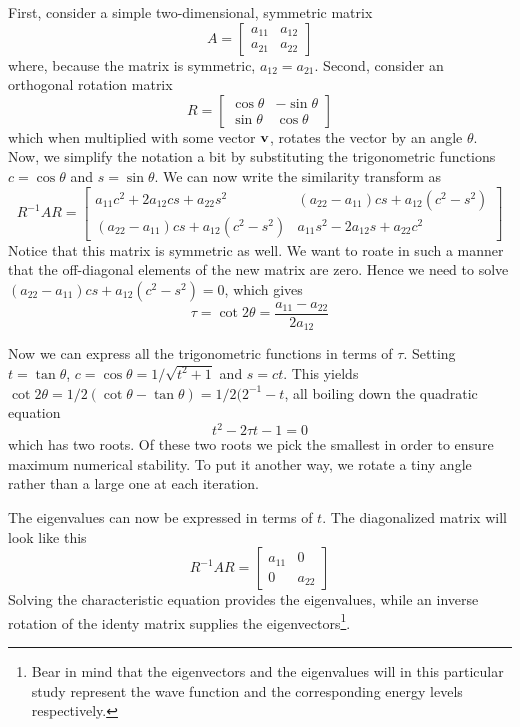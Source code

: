 \documentclass[10pt, a4paper]{amsart}
\begin{document}
First, consider a simple two-dimensional, symmetric matrix
\begin{equation}
A = \begin{bmatrix}
a_{11} & a_{12} \\
a_{21} & a_{22}
\end{bmatrix}
\end{equation}
where, because the matrix is symmetric, $a_{12}=a_{21}$. Second, consider an orthogonal rotation matrix
\begin{equation}
R = \begin{bmatrix}
\cos{\theta} & -\sin{\theta} \\
\sin{\theta} & \cos{\theta}
\end{bmatrix}
\end{equation}
which when multiplied with some vector $\vb{v}$, rotates the vector by an angle $\theta$. Now, we simplify the notation a bit by substituting the trigonometric functions $c=\cos{\theta}$ and $s=\sin{\theta}$. We can now write the similarity transform as
\begin{equation}
R^{-1}AR=\begin{bmatrix}
a_{11}c^2+2a_{12}cs + a_{22}s^2 & (a_{22}-a_{11})cs+a_{12}(c^2-s^2) \\
(a_{22}-a_{11})cs + a_{12}(c^2-s^2) & a_{11}s^2-2a_{12}s+a_{22}c^2
\end{bmatrix}
\end{equation}
Notice that this matrix is symmetric as well. We want to roate in such a manner that the off-diagonal elements of the new matrix are zero. Hence we need to solve $(a_{22}-a_{11})cs + a_{12}(c^2-s^2)=0$, which gives
\begin{equation}
\tau = \cot{2\theta} = \frac{a_{11}-a_{22}}{2a_{12}}
\end{equation}

Now we can express all the trigonometric functions in terms of $\tau$. Setting $t = \tan{\theta}$, $c=\cos{\theta}=1/\sqrt{t^2+1}$ and $s=ct$. This yields $\cot{2\theta}=1/2(\cot{\theta}-\tan{\theta}) = 1/2(2^{-1}-t$, all boiling down the quadratic equation
\begin{equation}
t^2-2\tau t-1 =0
\end{equation}
which has two roots. Of these two roots we pick the smallest in order to ensure maximum  numerical stability. To put it another way, we rotate a tiny angle rather than a large one at each iteration.

The eigenvalues can now be expressed in terms of $t$. The diagonalized matrix will look like this
\begin{equation}
R^{-1}AR = \begin{bmatrix}
a_{11} & 0 \\
0 & a_{22}
\end{bmatrix}
\end{equation}
Solving the characteristic equation provides the eigenvalues, while an inverse rotation of the identy matrix supplies the eigenvectors\footnote{Bear in mind that the eigenvectors and the eigenvalues will in this particular study represent the wave function and the corresponding energy levels respectively.}.
\end{document}
